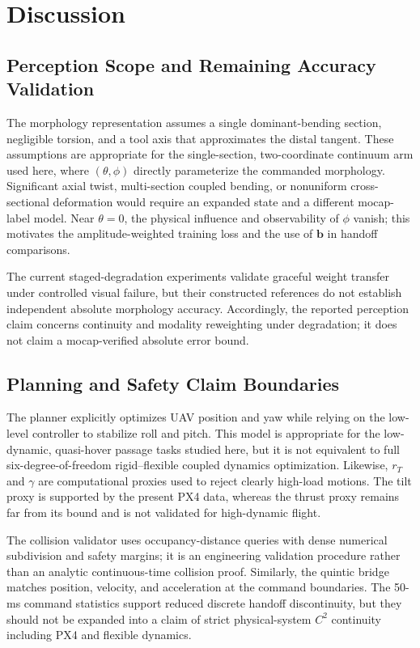 \documentclass[journal,twoside]{IEEEtran}
\begin{document}
\clearpage
\section{Discussion}
\subsection{Perception Scope and Remaining Accuracy Validation}
The morphology representation assumes a single dominant-bending section, negligible torsion, and a tool axis that approximates the distal tangent. These assumptions are appropriate for the single-section, two-coordinate continuum arm used here, where $(\theta,\phi)$ directly parameterize the commanded morphology. Significant axial twist, multi-section coupled bending, or nonuniform cross-sectional deformation would require an expanded state and a different mocap-label model. Near $\theta=0$, the physical influence and observability of $\phi$ vanish; this motivates the amplitude-weighted training loss and the use of $\mathbf b$ in handoff comparisons.

The current staged-degradation experiments validate graceful weight transfer under controlled visual failure, but their constructed references do not establish independent absolute morphology accuracy. Accordingly, the reported perception claim concerns continuity and modality reweighting under degradation; it does not claim a mocap-verified absolute error bound.

\subsection{Planning and Safety Claim Boundaries}
The planner explicitly optimizes UAV position and yaw while relying on the low-level controller to stabilize roll and pitch. This model is appropriate for the low-dynamic, quasi-hover passage tasks studied here, but it is not equivalent to full six-degree-of-freedom rigid--flexible coupled dynamics optimization. Likewise, $r_T$ and $\gamma$ are computational proxies used to reject clearly high-load motions. The tilt proxy is supported by the present PX4 data, whereas the thrust proxy remains far from its bound and is not validated for high-dynamic flight.

The collision validator uses occupancy-distance queries with dense numerical subdivision and safety margins; it is an engineering validation procedure rather than an analytic continuous-time collision proof. Similarly, the quintic bridge matches position, velocity, and acceleration at the command boundaries. The 50-ms command statistics support reduced discrete handoff discontinuity, but they should not be expanded into a claim of strict physical-system $C^2$ continuity including PX4 and flexible dynamics.
\end{document}
